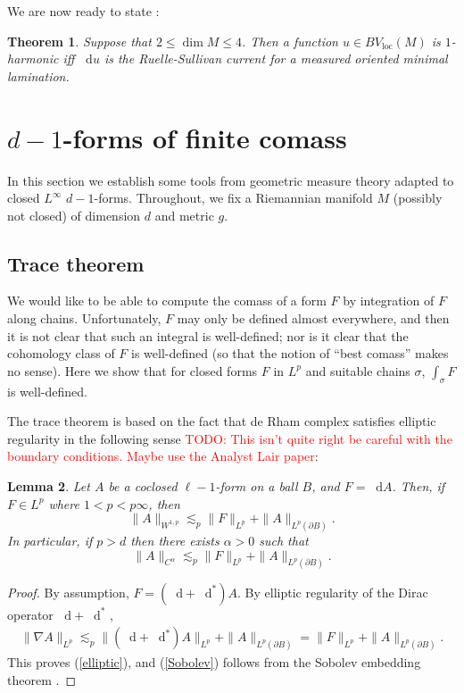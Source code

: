 \documentclass[reqno,11pt]{amsart}
\newcommand*\dif{\mathop{}\!\mathrm{d}}
\newcommand{\loc}{\mathrm{loc}}
\newtheorem{theorem}{Theorem}[section]
\newtheorem{lemma}[theorem]{Lemma}
\theoremstyle{definition}
\numberwithin{equation}{section}
\newcommand\todo[1]{\textcolor{red}{TODO: #1}}
\begin{document}
We are now ready to state \cite[Theorem C]{BackusCML}:

\begin{theorem}\label{1 harmonic is MOML}
Suppose that $2 \leq \dim M \leq 4$.
Then a function $u \in BV_\loc(M)$ is $1$-harmonic iff $\dif u$ is the Ruelle-Sullivan current for a measured oriented minimal lamination.
\end{theorem}




\section{\texorpdfstring{$d - 1$-forms}{(d - 1)-forms} of finite comass}\label{comass sec}
In this section we establish some tools from geometric measure theory adapted to closed $L^\infty$ $d - 1$-forms.
Throughout, we fix a Riemannian manifold $M$ (possibly not closed) of dimension $d$ and metric $g$.

\subsection{Trace theorem}
We would like to be able to compute the comass of a form $F$ by integration of $F$ along chains.
Unfortunately, $F$ may only be defined almost everywhere, and then it is not clear that such an integral is well-defined; nor is it clear that the cohomology class of $F$ is well-defined (so that the notion of ``best comass'' makes no sense).
Here we show that for closed forms $F$ in $L^p$ and suitable chains $\sigma$, $\int_\sigma F$ is well-defined.

The trace theorem is based on the fact that de Rham complex satisfies elliptic regularity in the following sense \todo{This isn't quite right be careful with the boundary conditions. Maybe use the Analyst Lair paper}:

\begin{lemma}
Let $A$ be a coclosed $\ell - 1$-form on a ball $B$, and $F = \dif A$.
Then, if $F \in L^p$ where $1 < p < p\infty$, then 
\begin{equation}\label{elliptic}
\|A\|_{W^{1, p}} \lesssim_p \|F\|_{L^p} + \|A\|_{L^p(\partial B)}.
\end{equation}
In particular, if $p > d$ then there exists $\alpha > 0$ such that
\begin{equation}\label{Sobolev}
\|A\|_{C^\alpha} \lesssim_p \|F\|_{L^p} + \|A\|_{L^p(\partial B)}.
\end{equation}
\end{lemma}
\begin{proof}
By assumption, $F = (\dif + \dif^*) A$.
By elliptic regularity of the Dirac operator $\dif + \dif^*$ \cite[\S4]{Scott95},
\begin{align*}
	\|\nabla A\|_{L^p} \lesssim_p \|(\dif + \dif^*) A\|_{L^p} + \|A\|_{L^p(\partial B)} = \|F\|_{L^p} + \|A\|_{L^p(\partial B)}.
\end{align*}
This proves (\ref{elliptic}), and (\ref{Sobolev}) follows from the Sobolev embedding theorem \cite[\S5.6, Theorem 4]{evans2010partial}.
\end{proof}
\end{document}

